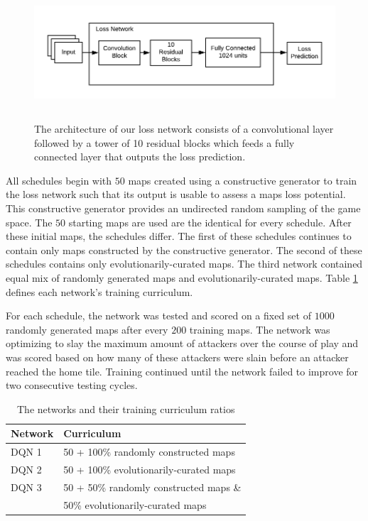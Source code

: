 \documentclass[letterpaper]{article} %
\begin{document}
\begin{figure}[tb]
\begin{center}
\includegraphics[width=0.9\linewidth,height=1.953in ]{graphics/loss-network.png}
\caption{The architecture of our loss network consists of a convolutional layer followed by a tower of 10 residual blocks which feeds a fully connected layer that outputs the loss prediction.}
\label{fig:loss-network-diagram}
\end{center}
\end{figure}

All schedules begin with $50$ maps created using a constructive generator to train the loss network such that its output is usable to assess a maps loss potential. This constructive generator provides an undirected random sampling of the game space. The $50$ starting maps are used are the identical for every schedule. After these initial maps, the schedules differ. The first of these schedules continues to contain only maps constructed by the constructive generator. The second of these schedules contains only evolutionarily-curated maps. The third network contained equal mix of randomly generated maps and evolutionarily-curated maps. Table \ref{table:networks} defines each network's training curriculum.

For each schedule, the network was tested and scored on a fixed set of $1000$ randomly generated maps after every $200$ training maps. The network was optimizing to slay the maximum amount of attackers over the course of play and was scored based on how many of these attackers were slain before an attacker reached the home tile. Training continued until the network failed to improve for two consecutive testing cycles.

\begin{table}[]
\begin{tabular}{|l|l|}
\hline
\textbf{Network} & \textbf{Curriculum} \\ \hline
DQN 1  & 50 + 100\% randomly constructed maps\\ \hline
DQN 2  & 50 + 100\% evolutionarily-curated maps\\ \hline
DQN 3  & 50 + 50\% randomly constructed maps \& \\
& 50\% evolutionarily-curated maps\\ \hline
\end{tabular}
\caption{The networks and their training curriculum ratios}
\label{table:networks}
\end{table}
\end{document}
